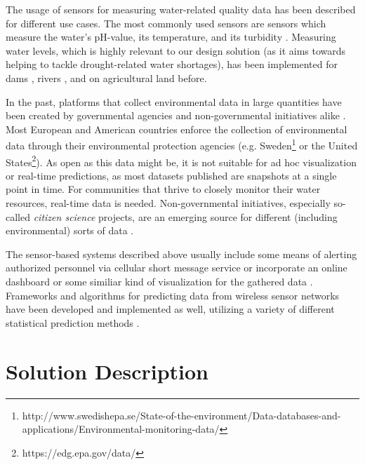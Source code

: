\documentclass[11pt, letterpaper]{article}
\begin{document}
The usage of sensors for measuring water-related quality data has been described for different use cases. The most commonly used sensors are sensors which measure the water's pH-value, its temperature, and its turbidity \cite{cloete2016design, jiang2009design, vijayakumar2015real, wiranto2015integrated}. Measuring water levels, which is highly relevant to our design solution (as it aims towards helping to tackle drought-related water shortages), has been implemented for dams \cite{siddula2018Dams, kavitha2018dams}, rivers \cite{amirruddin2012microcontroller}, and on agricultural land \cite{deekshath2018iot} before.
\newline

In the past, platforms that collect environmental data in large quantities have been created by governmental agencies and non-governmental initiatives alike \cite{mckinley2017citizen}. Most European and American countries enforce the collection of environmental data through their environmental protection agencies (e.g. Sweden\footnote{http://www.swedishepa.se/State-of-the-environment/Data-databases-and-applications/Environmental-monitoring-data/} or the United States\footnote{https://edg.epa.gov/data/}). As open as this data might be, it is not suitable for ad hoc visualization or real-time predictions, as most datasets published are snapshots at a single point in time. For communities that thrive to closely monitor their water resources, real-time data is needed. Non-governmental initiatives, especially so-called \textit{citizen science} projects, are an emerging source for different (including environmental) sorts of data \cite{kosmala2016assessing}.
\newline

The sensor-based systems described above usually include some means of alerting authorized personnel via cellular short message service or incorporate an online dashboard or some similiar kind of visualization for the gathered data \cite{shah2016customized}. Frameworks and algorithms for predicting data from wireless sensor networks have been developed and implemented as well, utilizing a variety of different statistical prediction methods \cite{wu2016data, mclean2005marine, lynch2008decentralized}.


\section{Solution Description}
\end{document}
